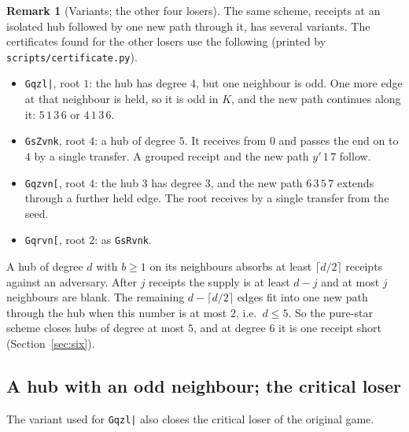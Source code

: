 \documentclass[11pt]{amsart}
\theoremstyle{definition}
\newtheorem{remark}[theorem]{Remark}
\begin{document}
\begin{remark}[Variants; the other four losers]\label{rem:variants}
The same scheme, receipts at an isolated hub followed by one new path through it, has several
variants. The certificates found for the other losers use the following (printed by
\texttt{scripts/certificate.py}).
\begin{itemize}
\item \texttt{Gqzl|}, root $1$: the hub has degree $4$, but one neighbour is odd. One more
edge at that neighbour is held, so it is odd in $K$, and the new path continues along it:
$5\,1\,3\,6$ or $4\,1\,3\,6$.
\item \texttt{GsZvnk}, root $4$: a hub of degree $5$. It receives from $0$ and passes the end on
to $4$ by a single transfer. A grouped receipt and the new path $y'\,1\,7$ follow.
\item \texttt{Gqzvn[}, root $4$: the hub $3$ has degree $3$, and the new path $6\,3\,5\,7$
extends through a further held edge. The root receives by a single transfer from the seed.
\item \texttt{Gqrvn[}, root $2$: as \texttt{GsRvnk}.
\end{itemize}
A hub of degree $d$ with $b\ge1$ on its neighbours absorbs at least $\lceil d/2\rceil$ receipts
against an adversary. After $j$ receipts the supply is at least $d-j$ and at most $j$ neighbours
are blank. The remaining $d-\lceil d/2\rceil$ edges fit into one new path through the hub when
this number is at most $2$, i.e.\ $d\le5$. So the pure-star scheme closes hubs of degree at most
$5$, and at degree $6$ it is one receipt short (Section~\ref{sec:six}).
\end{remark}

\subsection*{A hub with an odd neighbour; the critical loser}
The variant used for \texttt{Gqzl|} also closes the critical loser of the original game.
\end{document}

